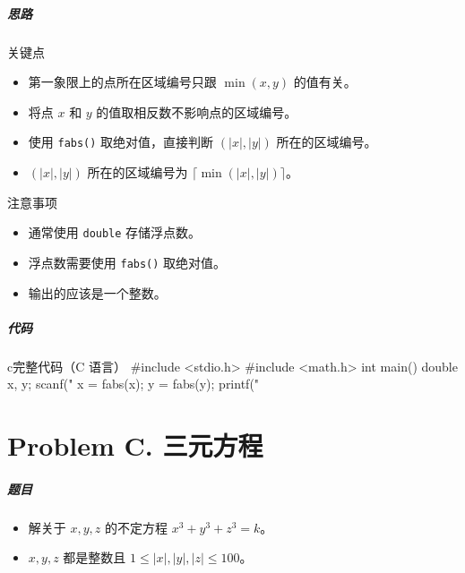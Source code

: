 \documentclass[
     aspectratio=169,                   %
]{beamer}
\begin{document}
\begin{frame}
	\frametitle{思路}
	 \begin{exampleblock}{关键点}
	 	\begin{itemize}
			\item 第一象限上的点所在区域编号只跟 $\min(x,y)$ 的值有关。
			\item 将点 $x$ 和 $y$ 的值取相反数不影响点的区域编号。
		\end{itemize}
	\end{exampleblock}
	\begin{itemize}
		\item 使用 \lstinline|fabs()| 取绝对值，直接判断 $(|x|,|y|)$ 所在的区域编号。
		\item $(|x|,|y|)$ 所在的区域编号为 $\lceil\min(|x|,|y|)\rceil$。
	\end{itemize}
	\begin{alertblock}{注意事项}
		\begin{itemize}
			\item 通常使用 \lstinline|double| 存储浮点数。
			\item 浮点数需要使用 \lstinline|fabs()| 取绝对值。
			\item 输出的应该是一个整数。
		\end{itemize}
	\end{alertblock}
\end{frame}

\begin{frame}[fragile]
	\frametitle{代码}
	\begin{codeblock}{c}{完整代码（C 语言）}
#include <stdio.h>
#include <math.h>
int main() {
    double x, y;
    scanf("%
    x = fabs(x);
    y = fabs(y);
    printf("%
}
\end{codeblock}
\end{frame}


\part{Problem C. 三元方程}
\begin{frame}
	\frametitle{题目}
	\begin{itemize}
		\item 解关于 $x,y,z$ 的不定方程 $x^3+y^3+z^3=k$。
		\item $x,y,z$ 都是整数且 $1 \leq |x|,|y|,|z| \leq 100$。
	\end{itemize}
\end{frame}
\end{document}
